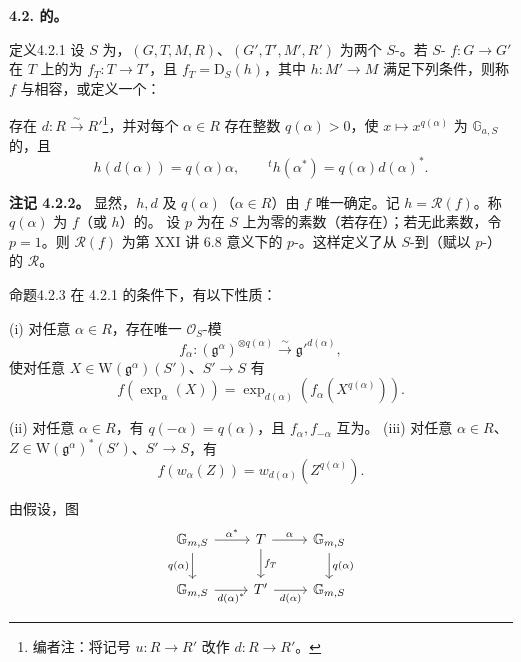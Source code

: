 \textbf{4.2. 的。}
\begin{SGAresult}{定义}{4.2.1} 设 $S$ 为，$(G,T,M,R)$、$(G',T',M',R')$ 为两个 $S$-。若 $S$- $f:G\to G'$ 在 $T$ 上的为 $f_T:T\to T'$，且 $f_T=\mathrm D_S(h)$，其中 $h:M'\to M$ 满足下列条件，则称 $f$ 与相容，或定义一个：

存在 $d:R\xrightarrow\sim R'$\footnote{编者注：将记号 $u:R\to R'$ 改作 $d:R\to R'$。}，并对每个 $\alpha\in R$ 存在整数 $q(\alpha)>0$，使 $x\mapsto x^{q(\alpha)}$ 为 $\mathbb G_{a,S}$ 的，且
\[h(d(\alpha))=q(\alpha)\alpha,\qquad{}^th(\alpha^*)=q(\alpha)d(\alpha)^*.\]
\end{SGAresult}
\textbf{注记 4.2.2。} 显然，$h,d$ 及 $q(\alpha)$（$\alpha\in R$）由 $f$ 唯一确定。记 $h=\mathcal R(f)$。称 $q(\alpha)$ 为 $f$（或 $h$）的。
设 $p$ 为在 $S$ 上为零的素数（若存在）；若无此素数，令 $p=1$。则 $\mathcal R(f)$ 为第 XXI 讲 6.8 意义下的 $p$-。这样定义了从 $S$-到（赋以 $p$-）的 $\mathcal R$。
\begin{SGAresult}{命题}{4.2.3} 在 4.2.1 的条件下，有以下性质：

(i) 对任意 $\alpha\in R$，存在唯一 $\mathcal O_S$-模
\[f_\alpha:(\mathfrak g^\alpha)^{\otimes q(\alpha)}\xrightarrow\sim\mathfrak g'^{d(\alpha)},\]
使对任意 $X\in\mathrm W(\mathfrak g^\alpha)(S')$、$S'\to S$ 有
\[f(\exp_\alpha(X))=\exp_{d(\alpha)}(f_\alpha(X^{q(\alpha)})).\]

(ii) 对任意 $\alpha\in R$，有 $q(-\alpha)=q(\alpha)$，且 $f_\alpha,f_{-\alpha}$ 互为。
(iii) 对任意 $\alpha\in R$、$Z\in\mathrm W(\mathfrak g^\alpha)^*(S')$、$S'\to S$，有
\[f(w_\alpha(Z))=w_{d(\alpha)}(Z^{q(\alpha)}).\]
\end{SGAresult}
由假设，图
\[\begin{tikzcd}\mathbb G_{m,S}\arrow[r,"\alpha^*"]\arrow[d,"q(\alpha)"']&T\arrow[r,"\alpha"]\arrow[d,"f_T"]&\mathbb G_{m,S}\arrow[d,"q(\alpha)"]\\\mathbb G_{m,S}\arrow[r,"d(\alpha)^*"']&T'\arrow[r,"d(\alpha)"']&\mathbb G_{m,S}\end{tikzcd}\]
